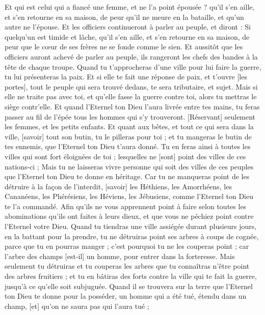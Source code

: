 \begin{multicols}{2}
Et qui est celui qui a fiancé une femme, et ne l'a point épousée ? qu'il s'en aille, et s'en retourne en sa maison, de peur qu'il ne meure en la bataille, et qu'un autre ne l'épouse.
Et les officiers continueront à parler au peuple, et diront : Si quelqu'un est timide et lâche, qu'il s'en aille, et s'en retourne en sa maison, de peur que le cœur de ses frères ne se fonde comme le sien.
Et aussitôt que les officiers auront achevé de parler au peuple, ils rangeront les chefs des bandes à la tête de chaque troupe.
Quand tu t'approcheras d'une ville pour lui faire la guerre, tu lui présenteras la paix.
Et si elle te fait une réponse de paix, et t'ouvre [les portes], tout le peuple qui sera trouvé dedans, te sera tributaire, et sujet.
Mais si elle ne traite pas avec toi, et qu'elle fasse la guerre contre toi, alors tu mettras le siège contr'elle.
Et quand l'Eternel ton Dieu l'aura livrée entre tes mains, tu feras passer au fil de l'épée tous les hommes qui s'y trouveront.
[Réservant] seulement les femmes, et les petits enfants. Et quant aux bêtes, et tout ce qui sera dans la ville, [savoir] tout son butin, tu le pilleras pour toi ; et tu mangeras le butin de tes ennemis, que l'Eternel ton Dieu t'aura donné.
Tu en feras ainsi à toutes les villes qui sont fort éloignées de toi ; lesquelles ne [sont] point des villes de ces nations-ci ;
Mais tu ne laisseras vivre personne qui soit des villes de ces peuples que l'Eternel ton Dieu te donne en héritage.
Car tu ne manqueras point de les détruire à la façon de l'interdit, [savoir] les Héthiens, les Amorrhéens, les Cananéens, les Phérésiens, les Héviens, les Jébusiens, comme l'Eternel ton Dieu te l'a commandé.
Afin qu'ils ne vous apprennent point à faire selon toutes les abominations qu'ils ont faites à leurs dieux, et que vous ne péchiez point contre l'Eternel votre Dieu.
Quand tu tiendras une ville assiégée durant plusieurs jours, en la battant pour la prendre, tu ne détruiras point ses arbres à coups de cognée, parce que tu en pourras manger ; c'est pourquoi tu ne les couperas point ; car l'arbre des champs [est-il] un homme, pour entrer dans la forteresse.
Mais seulement tu détruiras et tu couperas les arbres que tu connaîtras n'être point des arbres fruitiers ; et tu en bâtiras des forts contre la ville qui te fait la guerre, jusqu'à ce qu'elle soit subjuguée.
\VerseOne{}Quand il se trouvera sur la terre que l'Eternel ton Dieu te donne pour la posséder, un homme qui a été tué, étendu dans un champ, [et] qu'on ne saura pas qui l'aura tué ;

\end{multicols}
